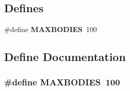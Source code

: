 \subsection*{Defines}
\begin{CompactItemize}
\item 
\#define {\bf MAXBODIES}\ 100
\end{CompactItemize}


\subsection{Define Documentation}
\subsubsection{\setlength{\rightskip}{0pt plus 5cm}\#define MAXBODIES\ 100}\label{geomPQP_h_a0}


